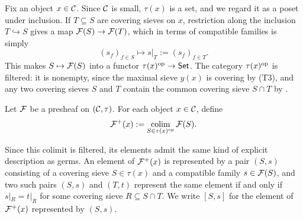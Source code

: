 Fix an object $x \in \catC$. Since $\catC$ is small, $\tau(x)$ is a set, and we regard it as a poset under inclusion. If $T \subseteq S$ are covering sieves on $x$, restriction along the inclusion $T \hookrightarrow S$ gives a map $\cal{F}(S) \to \cal{F}(T)$, which in terms of compatible families is simply
\[(s_f)_{f \in S} \mapsto s|_T := (s_f)_{f \in T}.\]
This makes $S \mapsto \cal{F}(S)$ into a functor $\tau(x)^\op \to \Set$. The category $\tau(x)^\op$ is filtered: it is nonempty, since the maximal sieve $y(x)$ is covering by (T3), and any two covering sieves $S$ and $T$ contain the common covering sieve $S \cap T$ by .

\begin{definition}\label{def:chap:sheaves:sec:sites:plus construction}
    Let $\cal{F}$ be a presheaf on $(\catC,\tau)$. For each object $x \in \catC$, define
    \[\cal{F}^+(x) := \colim_{S \in \tau(x)^\op} \cal{F}(S).\]
\end{definition}

Since this colimit is filtered, its elements admit the same kind of explicit description as germs. An element of $\cal{F}^+(x)$ is represented by a pair $(S,s)$ consisting of a covering sieve $S \in \tau(x)$ and a compatible family $s \in \cal{F}(S)$, and two such pairs $(S,s)$ and $(T,t)$ represent the same element if and only if $s|_R = t|_R$ for some covering sieve $R \subseteq S \cap T$. We write $[S,s]$ for the element of $\cal{F}^+(x)$ represented by $(S,s)$.

